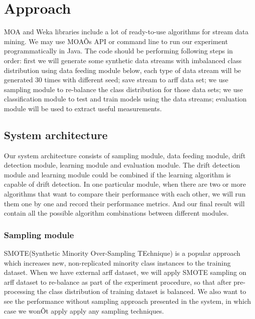 \documentclass[11pt]{article}\usepackage[]{graphicx}\usepackage[]{color}
\begin{document}
\section{Approach}

MOA and  Weka libraries include a lot of ready-to-use algorithms for stream data mining. We may use MOAÕs API or command line to run our experiment programmatically in Java. The code should be performing following steps in order:
first we will generate some synthetic data streams with imbalanced class distribution using data feeding module below, each type of data stream will be generated 30 times with different seed;
save stream to arff data set;
we use sampling module to re-balance the class distribution for those data sets;
we use classification module to test and train models using the data streams;
evaluation module will be used to extract useful measurements.

	
\subsection{System architecture}				
Our system architecture consists of sampling module, data feeding module, drift detection module, learning module and evaluation module. The drift detection module and learning module could be combined if the learning algorithm is capable of drift detection. In one particular module, when there are two or more algorithms that want to compare their performance with each other, we will run them one by one and record their performance metrics. And our final result will contain all the possible algorithm combinations between different modules.

\subsubsection{Sampling module}
SMOTE(Synthetic Minority Over-Sampling TEchnique) is a popular approach which increases new, non-replicated minority class instances to the training dataset. 
When we have external arff dataset, we will apply SMOTE sampling on arff dataset to re-balance as part of the experiment procedure, so that after pre-processing the class distribution of training dataset is balanced. We also want to see the performance without sampling approach presented in the system, in which case we wonÕt apply apply any sampling techniques.		
		
\end{document}
